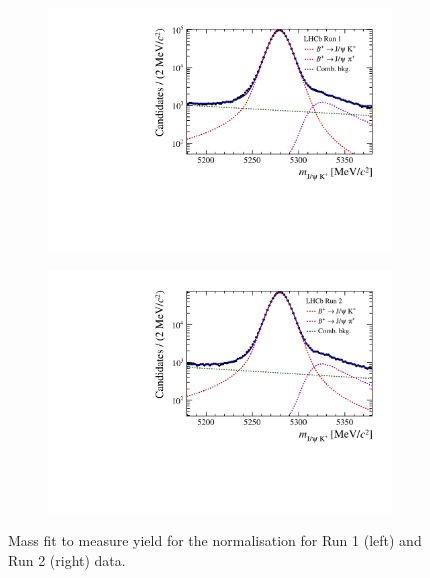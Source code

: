 {{\begin{figure}[htbp]
    \centering
   \begin{subfigure}[b]{0.48\textwidth}
        \includegraphics[width=  \textwidth]{./Figs/BFAnalysis/BuJpsiK_Run1.pdf}
    \end{subfigure}
    \begin{subfigure}[b]{0.48\textwidth}
       \includegraphics[width=\textwidth]{./Figs/BFAnalysis/BuJpsiK_Run2.pdf}
   \end{subfigure}
    \caption{ Mass fit to measure \bujpsik yield for the normalisation for Run 1 (left) and Run 2 (right) data.}
    \label{fig:Bujpsikyield}
\end{figure}


}}
